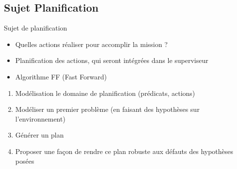 \documentclass[compress]{beamer}
\begin{document}
\subsection{Sujet Planification}
\begin{frame}{Sujet de planification}
\begin{itemize}
\item Quelles actions réaliser pour accomplir la mission ?
\item Planification des actions, qui seront intégrées dans le superviseur
\item Algorithme FF (Fast Forward)
\end{itemize}
\begin{enumerate}
\item Modélisation le domaine de planification (prédicats, actions)
\item Modéliser un premier problème (en faisant des hypothèses sur l'environnement)
\item Générer un plan
\item Proposer une façon de rendre ce plan robuste aux défauts des hypothèses posées
\end{enumerate}
\end{frame}
\end{document}
